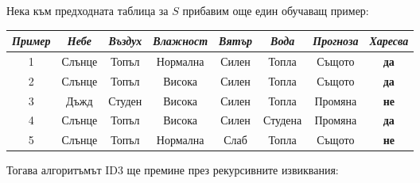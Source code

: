 \documentclass[12pt]{article}
\begin{document}
	Нека към предходната таблица за $S$ прибавим още един обучаващ пример:
	\newline
	\begin{table}[!h]
		\centering
		\begin{tabular}{|c|c|c|c|c|c|c|c|}
			\hline
			\textit{Пример} & \textit{Небе} & \textit{Въздух} & \textit{Влажност} & \textit{Вятър} & \textit{Вода} & \textit{Прогноза} & \textit{Харесва} \\ \hline
			1               & Слънце        & Топъл           & Нормална          & Силен          & Топла         & Същото            & \textbf{да}      \\ \hline
			2               & Слънце        & Топъл           & Висока            & Силен          & Топла         & Същото            & \textbf{да}      \\ \hline
			3               & Дъжд          & Студен          & Висока            & Силен          & Топла         & Промяна           & \textbf{не}      \\ \hline
			4               & Слънце        & Топъл           & Висока            & Силен          & Студена       & Промяна           & \textbf{да}      \\ \hline
			5               & Слънце        & Топъл           & Нормална            & Слаб          & Топла       & Същото           & \textbf{не}      \\ \hline
		\end{tabular}
	\end{table}
	\newline\newline
	Тогава алгоритъмът ID3 ще премине през рекурсивните извиквания:\newline
	
	
\end{document}
